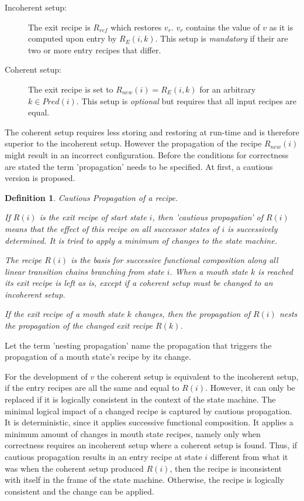 \documentclass[12pt,a4paper]{scrartcl}
\newtheorem{definition}{Definition}
\begin{document}
\begin{description}

    \item[Incoherent setup:] The exit recipe is $R_{ref}$ which restores $v_r$.
        $v_r$ contains the value of $v$ as it is computed upon entry by
        $R_E(i,k)$.  This setup is \textit{mandatory} if their are two or more
        entry recipes that differ.

    \item[Coherent setup:] The exit recipe is set to $R_{new}(i)=R_E(i,k)$ for an 
        arbitrary $k\in Pred(i)$. This setup is \textit{optional} but requires that all
        input recipes are equal.
\end{description}

The coherent setup requires less storing and restoring at run-time and is
therefore superior to the incoherent setup.  However the propagation of the
recipe $R_{new}(i)$ might result in an incorrect configuration.  Before the
conditions for correctness are stated the term 'propagation' needs to be
specified. At first, a cautious version is proposed.

\begin{definition} Cautious Propagation of a recipe.
    
    If $R(i)$ is the exit recipe of start state $i$, then 'cautious propagation'
    of $R(i)$ means that the effect of this recipe on all successor states of
    $i$ is successively determined. It is tried to apply a minimum of changes
    to the state machine.

    The recipe $R(i)$ is the basis for successive functional composition along
    all linear transition chains branching from state $i$. When a mouth state
    $k$ is reached its exit recipe is left as is, except if a coherent
    setup must be changed to an incoherent setup.
    
    If the exit recipe of a  mouth state $k$ changes, then the propagation of
    $R(i)$ nests the propagation of the changed exit recipe $R(k)$. 
    
\end{definition}

Let the term 'nesting propagation' name the propagation that triggers the
propagation of a mouth state's recipe by its change.

For the development of $v$ the coherent setup is equivalent to the incoherent
setup, if the entry recipes are all the same and equal to $R(i)$. However, it
can only be replaced if it is logically consistent in the context of the state
machine. The minimal logical impact of a changed recipe is captured by cautious
propagation. It is deterministic, since it applies successive functional
composition. It applies a minimum amount of changes in mouth state recipes,
namely only when correctness requires an incoherent setup where a coherent
setup is found. Thus, if cautious propagation results in an entry recipe at
state $i$ different from what it was when the coherent setup produced $R(i)$,
then the recipe is inconsistent with itself in the frame of the state machine.
Otherwise, the recipe is logically consistent and the change can be applied.
\end{document}
